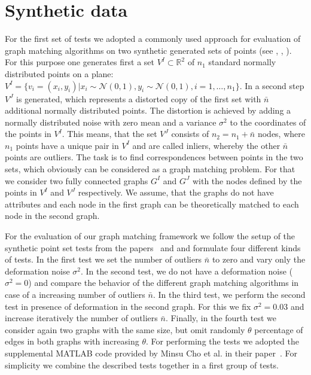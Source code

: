 \section{Synthetic data}
For the first set of tests we adopted a commonly used approach for evaluation of graph matching algorithms on two synthetic generated sets of points (see \cite{Cho2014_Haystack}, \cite{Cho2010_RRWM}, \cite{Leordeanu2009_IPFP}). 
For this purpose one generates first a set $V^I\subset\mathbb{R}^2$ of $n_1$ standard normally distributed points on a plane: $V^I=\{v_i=(x_i,y_i)|x_i\sim\mathcal{N}(0,1),y_i\sim\mathcal{N}(0,1),i=1,\dots,n_1\}$. In a second step $V^J$ is generated, which represents a distorted copy of the first set with $\bar{n}$ additional normally distributed points. The distortion is achieved by adding a normally distributed noise with zero mean and a variance $\sigma^2$ to the coordinates of the points in $V^I$. 
This means, that the set $V^J$ consists of $n_2=n_1+\bar{n}$ nodes, where $n_1$ points have a unique pair in $V^I$ and are called inliers, whereby the other $\bar{n}$ points are outliers. The task is to find correspondences between points in the two sets, which obviously can be considered as a graph matching problem. For that we consider two fully connected graphs $G^I$ and $G^J$ with the nodes defined by the points in $V^I$ and $V^J$ respectively. We assume, that the graphs do not have attributes and each node in the first graph can be theoretically matched to each node in the second graph.

For the evaluation of our graph matching framework we follow the setup of the synthetic point set tests from the papers~\cite{Cho2014_Haystack} and \cite{FastPFP} and formulate four different kinds of tests. In the first test we set the number of outliers $\bar{n}$ to zero and vary only the deformation noise $\sigma^2$. In the second test, we do not have a deformation noise ($\sigma^2=0$) and compare the behavior of the different graph matching algorithms in case of a increasing number of outliers $\bar{n}$. In the third test, we perform the second test in presence of deformation in the second graph. For this we fix $\sigma^2= 0.03$ and increase iteratively the number of outliers $\bar{n}$. Finally, in the fourth test we consider again two graphs with the same size, but omit randomly $\theta$ percentage of edges in both graphs with increasing $\theta$. 
For performing the tests we adopted the supplemental MATLAB code provided by Minsu Cho et al. in their paper~\cite{Cho2014_Haystack,code_MPM}. For simplicity we combine the described tests together in a first group of tests. %

